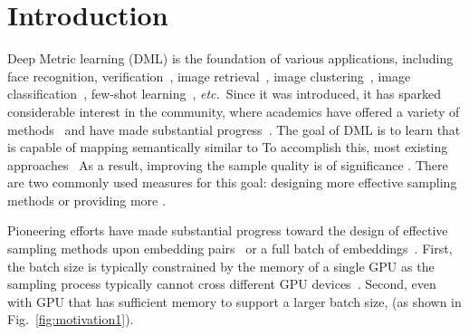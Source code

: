 \documentclass[runningheads]{llncs}
\def\etc{\emph{etc.}} \def\vs{\emph{vs.}}
\begin{document}
\section{Introduction}
Deep Metric learning (DML) is the foundation of various applications, including face recognition, verification~\cite{deng2019arcface,schroff2015facenet}, image retrieval~\cite{hoi2010semi}, image clustering~\cite{guo2017improved}, image classification~\cite{ding2016robust}, few-shot learning~\cite{liu2020dynamic},  \etc~Since it was introduced, it has sparked considerable interest in the community, where academics have offered a variety of methods~\cite{hadsell2006dimensionality,movshovitz2017no,oh2016deep,schroff2015facenet,sohn2016improved,wang2019multi,wu2017sampling} and have made substantial progress~\cite{musgrave2020metric,roth2020revisiting}. The goal of DML is to learn  that is capable of mapping semantically similar  to  To accomplish this, most existing approaches~\cite{chen2017beyond,hadsell2006dimensionality,schroff2015facenet,ustinova2016learning,wang2019multi,wu2017sampling}  As a result, improving the sample quality is of significance . There are two commonly used measures for this goal: designing more effective sampling methods or providing more .

Pioneering efforts have made substantial progress toward the design of effective sampling methods upon embedding pairs~\cite{roth2020revisiting,schroff2015facenet,wu2017sampling} or a full batch of embeddings~\cite{movshovitz2017no,oh2016deep}. 
First, the batch size is typically constrained by the memory of a single GPU as the sampling process typically cannot cross different GPU devices~\cite{roth2020revisiting}. Second, even with GPU that has sufficient memory to support a larger batch size,  (as shown in Fig.~\ref{fig:motivation1}).  
\end{document}
